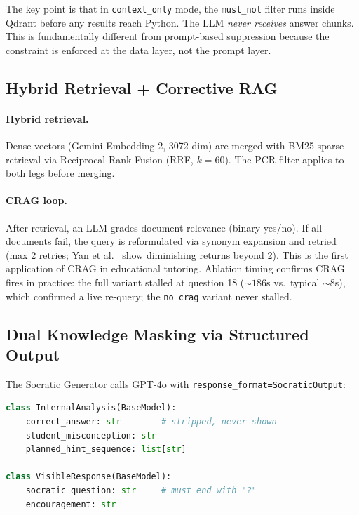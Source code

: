 \documentclass[11pt]{article}
\begin{document}
The key point is that in \texttt{context\_only} mode, the \texttt{must\_not}
filter runs inside Qdrant before any results reach Python.
The LLM \emph{never receives} answer chunks.
This is fundamentally different from prompt-based suppression because the
constraint is enforced at the data layer, not the prompt layer.

\subsection{Hybrid Retrieval + Corrective RAG}

\paragraph{Hybrid retrieval.}
Dense vectors (Gemini Embedding 2, 3072-dim) are merged with BM25 sparse
retrieval via Reciprocal Rank Fusion (RRF, $k{=}60$).
The PCR filter applies to both legs before merging.

\paragraph{CRAG loop.}
After retrieval, an LLM grades document relevance (binary yes/no).
If all documents fail, the query is reformulated via synonym expansion and
retried (max 2 retries; Yan et al.\ \cite{crag2024} show diminishing returns beyond 2).
This is the first application of CRAG in educational tutoring.
Ablation timing confirms CRAG fires in practice: the full variant stalled at
question 18 (${\sim}186$s vs.\ typical ${\sim}8$s), which confirmed a live re-query;
the \texttt{no\_crag} variant never stalled.

\subsection{Dual Knowledge Masking via Structured Output}

The Socratic Generator calls GPT-4o with
\texttt{response\_format=SocraticOutput}:

\begin{lstlisting}[language=Python]
class InternalAnalysis(BaseModel):
    correct_answer: str        # stripped, never shown
    student_misconception: str
    planned_hint_sequence: list[str]

class VisibleResponse(BaseModel):
    socratic_question: str     # must end with "?"
    encouragement: str
\end{lstlisting}
\end{document}
